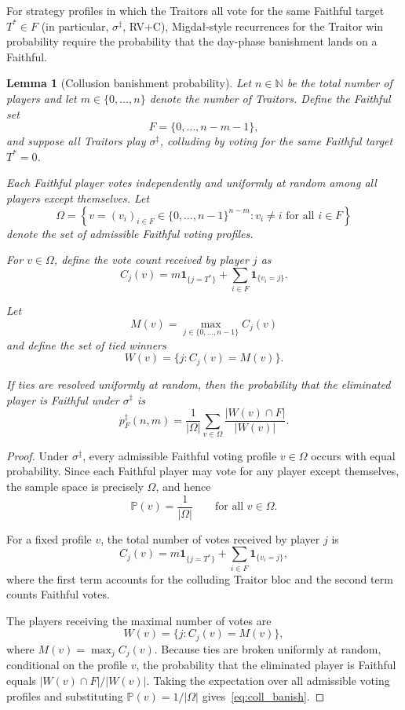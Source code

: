 \documentclass[11pt,a4paper]{article}
\newtheorem{lemma}{Lemma}
\begin{document}
For strategy profiles in which the Traitors all vote for the same Faithful
target \(T^* \in F\) (in particular, \(\sigma^\ddagger\), RV+C),
Migda\l{}-style recurrences for the Traitor win probability require the
probability that the day-phase banishment lands on a Faithful.

\begin{lemma}[Collusion banishment probability]\label{lemma:collusion}
Let \(n \in \mathbb{N}\) be the total number of players and let
\(m \in \{0,\dots,n\}\) denote the number of Traitors. Define the
Faithful set
\[
F=\{0,\dots,n-m-1\},
\]
and suppose all Traitors play \(\sigma^\ddagger\), colluding by voting
for the same Faithful target \(T^\ast = 0\).

Each Faithful player votes independently and uniformly at random among
all players except themselves. Let
\[
\Omega
=
\left\{
v=(v_i)_{i\in F}\in \{0,\dots,n-1\}^{n-m}
:
v_i\neq i
\text{ for all } i\in F
\right\}
\]
denote the set of admissible Faithful voting profiles.

For \(v\in\Omega\), define the vote count received by player \(j\) as
\[
C_j(v)
=
m\mathbf 1_{\{j=T^\ast\}}
+
\sum_{i\in F}\mathbf 1_{\{v_i=j\}}.
\]

Let
\[
M(v)=\max_{j\in\{0,\dots,n-1\}} C_j(v)
\]
and define the set of tied winners
\[
W(v)=\{j : C_j(v)=M(v)\}.
\]

If ties are resolved uniformly at random, then the probability that the
eliminated player is Faithful under \(\sigma^\ddagger\) is
\begin{equation}\label{eq:coll_banish}
p_F^{\ddagger}(n,m)
=
\frac1{|\Omega|}
\sum_{v\in\Omega}
\frac{|W(v)\cap F|}{|W(v)|}.
\end{equation}
\end{lemma}

\begin{proof}
Under \(\sigma^\ddagger\), every admissible Faithful voting profile
\(v\in\Omega\) occurs with equal probability. Since each Faithful player
may vote for any player except themselves, the sample space is precisely
\(\Omega\), and hence
\[
\mathbb{P}(v)=\frac1{|\Omega|}
\qquad
\text{for all } v\in\Omega.
\]

For a fixed profile \(v\), the total number of votes received by player
\(j\) is
\[
C_j(v)
=
m\mathbf 1_{\{j=T^\ast\}}
+
\sum_{i\in F}\mathbf 1_{\{v_i=j\}},
\]
where the first term accounts for the colluding Traitor bloc and the
second term counts Faithful votes.

The players receiving the maximal number of votes are
\[
W(v)=\{j : C_j(v)=M(v)\},
\]
where \(M(v)=\max_j C_j(v)\). Because ties are broken uniformly at
random, conditional on the profile \(v\), the probability that the
eliminated player is Faithful equals \(|W(v)\cap F|/|W(v)|\). Taking
the expectation over all admissible voting profiles and substituting
\(\mathbb{P}(v)=1/|\Omega|\) gives~\eqref{eq:coll_banish}.
\end{proof}
\end{document}
